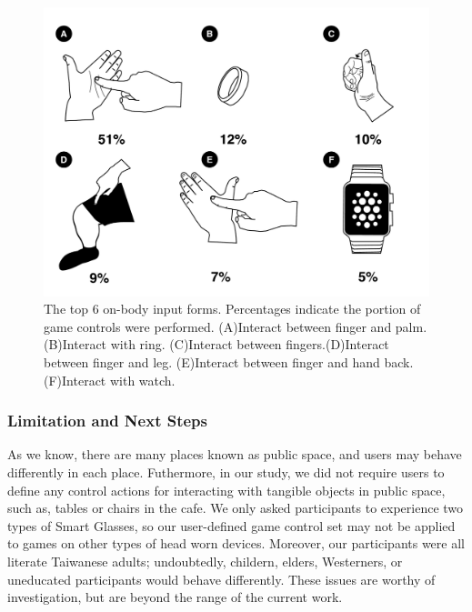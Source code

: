 \documentclass{sigchi}
\begin{document}
 \begin{figure}[!h]
  \centering
  \includegraphics[width=1\columnwidth]{OnBodyForms.pdf}
  \caption{The top 6 on-body input forms. Percentages indicate the portion of game controls were performed. (A)Interact between finger and palm. (B)Interact with ring. (C)Interact between fingers.(D)Interact between finger and leg. (E)Interact between finger and hand back. (F)Interact with watch.}
  \label{fig:figureOnBodyPorpotion}
  \end{figure}   

  \subsubsection{Limitation and Next Steps}

  As we know, there are many places known as public space, and users may behave differently in each place. Futhermore, in our study, we did not require users to define any control actions for interacting with tangible objects in public space, such as, tables or chairs in the cafe. We only asked participants to experience two types of Smart Glasses, so our user-defined game control set may not be applied to games on other types of head worn devices. Moreover, our participants were all literate Taiwanese adults; undoubtedly, childern, elders, Westerners, or uneducated participants would behave differently. These issues are worthy of investigation, but are beyond the range of the current work.
\end{document}
